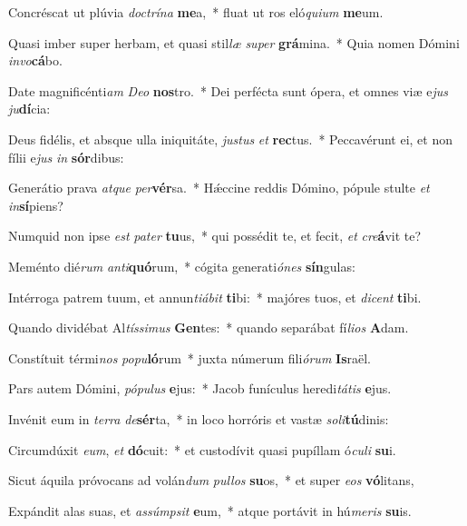 \item Concréscat ut plúvia \textit{doc}\textit{trí}\textit{na} \textbf{me}a,~* fluat ut ros eló\textit{qui}\textit{um} \textbf{me}um.
\item Quasi imber super herbam, et quasi stil\textit{læ} \textit{su}\textit{per} \textbf{grá}mina.~* Quia nomen Dómini \textit{in}\textit{vo}\textbf{cá}bo.
\item Date magnificénti\textit{am} \textit{De}\textit{o} \textbf{nos}tro.~* Dei perfécta sunt ópera, et omnes viæ e\textit{jus} \textit{ju}\textbf{dí}cia:
\item Deus fidélis, et absque ulla iniquitáte, \textit{jus}\textit{tus} \textit{et} \textbf{rec}tus.~* Peccavérunt ei, et non fílii e\textit{jus} \textit{in} \textbf{sór}dibus:
\item Generátio prava \textit{at}\textit{que} \textit{per}\textbf{vér}sa.~* Hǽccine reddis Dómino, pópule stulte \textit{et} \textit{in}\textbf{sí}piens?
\item Numquid non ipse \textit{est} \textit{pa}\textit{ter} \textbf{tu}us,~* qui possédit te, et fecit, \textit{et} \textit{cre}\textbf{á}vit te?
\item Meménto dié\textit{rum} \textit{an}\textit{ti}\textbf{quó}rum,~* cógita generati\textit{ó}\textit{nes} \textbf{sín}gulas:
\item Intérroga patrem tuum, et annun\textit{ti}\textit{á}\textit{bit} \textbf{ti}bi:~* majóres tuos, et \textit{di}\textit{cent} \textbf{ti}bi.
\item Quando dividébat Al\textit{tís}\textit{si}\textit{mus} \textbf{Gen}tes:~* quando separábat fí\textit{li}\textit{os} \textbf{A}dam.
\item Constítuit térmi\textit{nos} \textit{po}\textit{pu}\textbf{ló}rum~* juxta númerum fili\textit{ó}\textit{rum} \textbf{Is}raël.
\item Pars autem Dómini, \textit{pó}\textit{pu}\textit{lus} \textbf{e}jus:~* Jacob funículus heredi\textit{tá}\textit{tis} \textbf{e}jus.
\item Invénit eum in \textit{ter}\textit{ra} \textit{de}\textbf{sér}ta,~* in loco horróris et vastæ \textit{so}\textit{li}\textbf{tú}dinis:
\item Circumdúxit \textit{e}\textit{um}, \textit{et} \textbf{dó}cuit:~* et custodívit quasi pupíllam ó\textit{cu}\textit{li} \textbf{su}i.
\item Sicut áquila próvocans ad volán\textit{dum} \textit{pul}\textit{los} \textbf{su}os,~* et super \textit{e}\textit{os} \textbf{vó}litans,
\item Expándit alas suas, et \textit{as}\textit{súmp}\textit{sit} \textbf{e}um,~* atque portávit in hú\textit{me}\textit{ris} \textbf{su}is.

